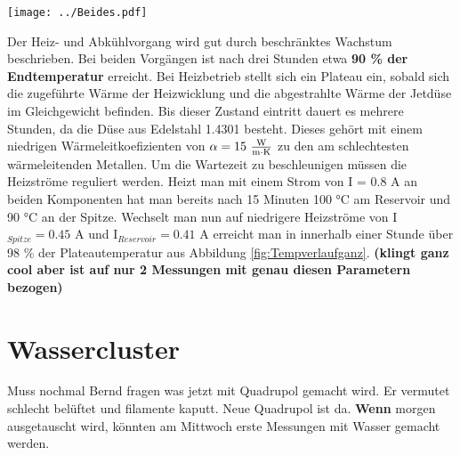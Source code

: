 \begin{center}
\begin{minipage}{\linewidth}
\centering
\texttt{[image: ../Beides.pdf]}%
 \label{fig:Tempverlaufganz}
\end{minipage} 
\end{center} 

Der Heiz- und Abkühlvorgang wird gut durch beschränktes Wachstum beschrieben. Bei beiden Vorgängen ist nach drei Stunden etwa \textbf{90 \% der Endtemperatur} erreicht. Bei Heizbetrieb stellt sich ein Plateau ein, sobald sich die zugeführte Wärme der Heizwicklung und die abgestrahlte Wärme der Jetdüse im Gleichgewicht befinden. Bis dieser Zustand eintritt dauert es mehrere Stunden, da die Düse aus Edelstahl 1.4301 besteht. Dieses gehört mit einem niedrigen Wärmeleitkoefizienten von $\alpha = 15\ \frac{\textmd{W}}{\textmd{m}\cdot \textmd{K}}$ zu den am schlechtesten wärmeleitenden Metallen. Um die Wartezeit zu beschleunigen müssen die Heizströme reguliert werden. Heizt man mit einem Strom von I = 0.8 A an beiden Komponenten hat man bereits nach 15 Minuten 100 °C am Reservoir und 90 °C an der Spitze. Wechselt man nun auf niedrigere Heizströme von I$_{Spitze} = 0.45$ A und I$_{Reservoir} = 0.41$ A erreicht man in innerhalb einer Stunde über 98 \% der Plateautemperatur aus Abbildung \ref{fig:Tempverlaufganz}. \textbf{(klingt ganz cool aber ist auf nur 2 Messungen mit genau diesen Parametern bezogen)}


\section{Wassercluster}

Muss nochmal Bernd fragen was jetzt mit Quadrupol gemacht wird. Er vermutet schlecht belüftet und filamente kaputt. Neue Quadrupol ist da. \textbf{Wenn} morgen ausgetauscht wird, könnten am Mittwoch erste Messungen mit Wasser gemacht werden.

